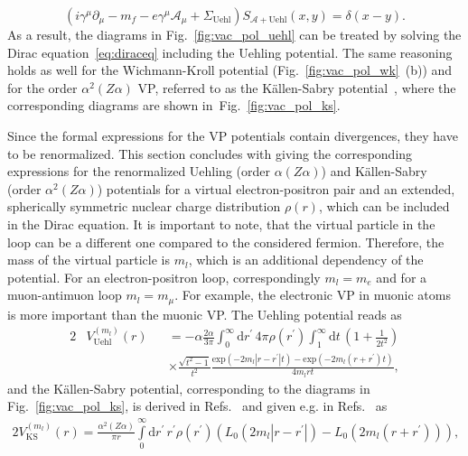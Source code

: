 \begin{equation}
\left(i\gamma^\mu \partial_\mu -m_f - e \gamma^\mu \mathcal{A}_\mu + \Sigma_{\text{Uehl}}\right)S_{\mathcal{A}+\text{Uehl}}(x,y)=\delta(x-y).
\label{eq:uehlprop}
\end{equation}
As a result, the diagrams in Fig.~\ref{fig:vac_pol_uehl} can be treated by solving the Dirac equation~\eqref{eq:diraceq} including the Uehling potential. The same reasoning holds as well for the Wichmann-Kroll potential (Fig.~\ref{fig:vac_pol_wk}~(b)) and for the order $\alpha^2(Z\alpha)$ VP, referred to as the Källen-Sabry potential~\cite{kallen1955}, where the corresponding diagrams are shown in~Fig.~\ref{fig:vac_pol_ks}. 

Since the formal expressions for the VP potentials contain divergences, they have to be renormalized. This section concludes with giving the corresponding expressions for the renormalized Uehling (order $\alpha(Z\alpha)$) and Källen-Sabry (order $\alpha^2(Z\alpha)$) potentials for a virtual electron-positron pair and an extended, spherically symmetric nuclear charge distribution $\rho(r)$, which can be included in the Dirac equation. It is important to note, that the virtual particle in the loop can be a different one compared to the considered fermion. Therefore, the mass of the virtual particle is $m_l$, which is an additional dependency of the potential. For an electron-positron loop, correspondingly $m_l=m_e$ and for a muon-antimuon loop $m_l=m_\mu$. For example, the electronic VP in muonic atoms is more important than the muonic VP. The Uehling potential reads as~\cite{Fullerton1976,Elizarov2005}
\begin{alignat}{2}
&V^{(m_l)}_{\text{Uehl}}(r)&&=-\alpha \frac{2\alpha}{3\pi}\int_0^\infty \text{d}r^{\prime}\,4\pi \rho(r^\prime)\int_1^\infty \text{d}t\,\left( 1+\frac{1}{2t^2} \right)\nonumber\\[7.5pt]
&&&\times\frac{\sqrt{t^2-1}}{t^2} \frac{\text{exp}(-2m_l|r-r^\prime|t)-\text{exp}(-2m_l(r+r^\prime)t)}{4m_lr t},
\label{eq:uehlPot}
\end{alignat}
and the Källen-Sabry potential, corresponding to the diagrams in Fig.~\ref{fig:vac_pol_ks}, is derived in Refs.~\cite{Barbieri1970,Barbieri1972,Barbieri1972_2,Barbieri1973} and given e.g. in Refs.~\cite{indelicato2013,Fullerton1976} as
\begin{alignat}{2}
V^{(m_l)}_{\text{KS}}(r)=\frac{\alpha^2(Z\alpha)}{\pi r}\int\limits_0^\infty\text{d}r^\prime\,r^\prime \rho(r^\prime)\left( L_0(2m_l|r-r^\prime|)-L_0(2m_l(r+r^\prime))\right),\label{eq:KSPot}
\end{alignat}
